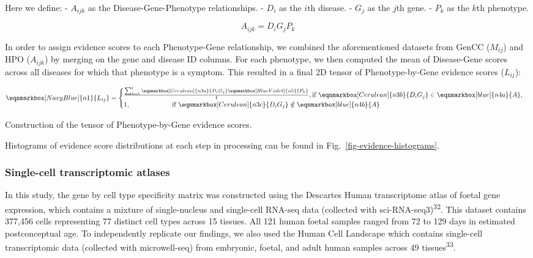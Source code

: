 \documentclass[
]{article}
\begin{document}
Here we define: - \(A_{ijk}\) as the Disease-Gene-Phenotype
relationships. - \(D_i\) as the \(i\)th disease. - \(G_j\) as the
\(j\)th gene. - \(P_k\) as the \(k\)th phenotype.

\[
A_{ijk} = D_i G_j P_k
\]

In order to assign evidence scores to each Phenotype-Gene relationship,
we combined the aforementioned datasets from GenCC (\(M_{ij}\)) and HPO
(\(A_{ijk}\)) by merging on the gene and disease ID columns. For each
phenotype, we then computed the mean of Disease-Gene scores across all
diseases for which that phenotype is a symptom. This resulted in a final
2D tensor of Phenotype-by-Gene evidence scores (\(L_{ij}\)):

\hfill\break
\hfill\break

\[
 \eqnmarkbox[NavyBlue]{n1}{ L_{ij} } = 
 \begin{cases}
  \frac{\sum_{k=1}^{\text{f}} 
    \eqnmarkbox[Cerulean]{n3a}{D_i G_j} 
    \eqnmarkbox[BlueViolet]{n5}{P_k} 
    }{\text{f}}, 
  \text{if } \eqnmarkbox[Cerulean]{n3b}{D_i G_j} 
    \in \eqnmarkbox[blue]{n4a}{A},
  \\
  1, \hspace{2.2cm}
  \text{if } \eqnmarkbox[Cerulean]{n3c}{D_i G_j} 
    \notin\eqnmarkbox[blue]{n4b}{A}
 \end{cases}
\]

\hfill\break

Construction of the tensor of Phenotype-by-Gene evidence scores.

\hfill\break

Histograms of evidence score distributions at each step in processing
can be found in Fig.~\ref{fig-evidence-histograms}.

\subsubsection{Single-cell transcriptomic
atlases}\label{single-cell-transcriptomic-atlases}

In this study, the gene by cell type specificity matrix was constructed
using the Descartes Human transcriptome atlas of foetal gene expression,
which contains a mixture of single-nucleus and single-cell RNA-seq data
(collected with sci-RNA-seq3)\textsuperscript{32}. This dataset contains
377,456 cells representing 77 distinct cell types across 15 tissues. All
121 human foetal samples ranged from 72 to 129 days in estimated
postconceptual age. To independently replicate our findings, we also
used the Human Cell Landscape which contains single-cell transcriptomic
data (collected with microwell-seq) from embryonic, foetal, and adult
human samples across 49 tissues\textsuperscript{33}.
\end{document}

